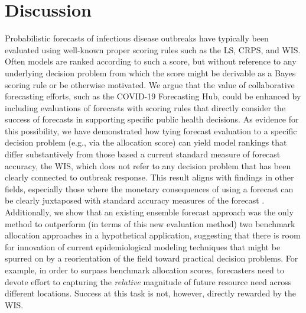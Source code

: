 \documentclass{article}\usepackage[]{graphicx}\usepackage[]{xcolor}
\begin{document}
\section{Discussion}
\label{sec:discussion}

Probabilistic forecasts of infectious disease outbreaks have typically been evaluated using well-known proper scoring
rules such as the LS, CRPS, and WIS. Often models are ranked according to such a score, but without reference to any
underlying decision problem from which the score might be derivable as a Bayes scoring rule or be otherwise motivated.
We argue that the value of collaborative forecasting efforts, such as the COVID-19 Forecasting Hub, could be enhanced by
including evaluations of forecasts with
scoring rules that directly consider the success of forecasts in supporting specific public health decisions. As evidence for this
possibility, we have demonstrated how tying forecast evaluation to a specific decision problem (e.g., via the allocation
score) can yield model rankings that differ substantively from those based a current standard measure of forecast
accuracy, the WIS, which does not refer to any decision problem that has been clearly connected to outbreak response.
This result aligns with findings in other fields, especially those where the monetary consequences of using a forecast
can be clearly juxtaposed with standard accuracy measures of the forecast \citep{leitch1991economicForecastEval,
murphy1993whatisagoodforecast, cenesizoglu2012returnPredictionEconValue}. Additionally, we show that an existing
ensemble forecast approach was the only method to outperform (in terms of this new evaluation method) two benchmark
allocation approaches in a hypothetical application, suggesting that there is room for innovation of current
epidemiological modeling techniques that might be spurred on by a reorientation of the field toward practical decision
problems. For example, in order to surpass benchmark allocation scores, forecasters need to devote effort to capturing
the \emph{relative} magnitude of future resource need across different locations.  Success at this task is not, however,
directly rewarded by the WIS. 
\end{document}
